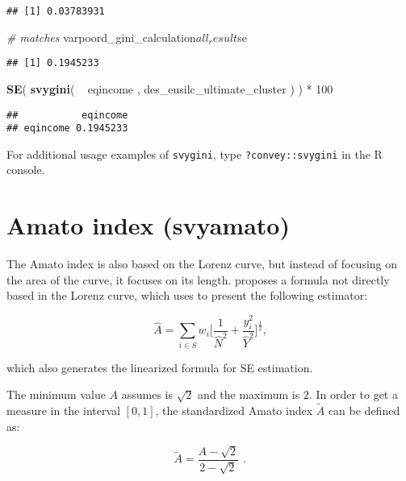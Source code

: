 \documentclass[]{book}
\newenvironment{Shaded}{\begin{snugshade}}{\end{snugshade}}
\newcommand{\KeywordTok}[1]{\textcolor[rgb]{0.13,0.29,0.53}{\textbf{{#1}}}}
\newcommand{\DecValTok}[1]{\textcolor[rgb]{0.00,0.00,0.81}{{#1}}}
\newcommand{\StringTok}[1]{\textcolor[rgb]{0.31,0.60,0.02}{{#1}}}
\newcommand{\CommentTok}[1]{\textcolor[rgb]{0.56,0.35,0.01}{\textit{{#1}}}}
\newcommand{\NormalTok}[1]{{#1}}
\theoremstyle{definition}
\theoremstyle{definition}
\theoremstyle{remark}
\begin{document}
\begin{verbatim}
## [1] 0.03783931
\end{verbatim}

\begin{Shaded}
\begin{Highlighting}[]
\CommentTok{# matches}
\NormalTok{varpoord_gini_calculation$all_result$se}
\end{Highlighting}
\end{Shaded}

\begin{verbatim}
## [1] 0.1945233
\end{verbatim}

\begin{Shaded}
\begin{Highlighting}[]
\KeywordTok{SE}\NormalTok{( }\KeywordTok{svygini}\NormalTok{( ~}\StringTok{ }\NormalTok{eqincome , des_eusilc_ultimate_cluster ) ) *}\StringTok{ }\DecValTok{100}
\end{Highlighting}
\end{Shaded}

\begin{verbatim}
##           eqincome
## eqincome 0.1945233
\end{verbatim}

For additional usage examples of \texttt{svygini}, type
\texttt{?convey::svygini} in the R console.

\section{Amato index (svyamato)}\label{amato-index-svyamato}

The Amato index is also based on the Lorenz curve, but instead of
focusing on the area of the curve, it focuses on its length.
\citep{arnold2012} proposes a formula not directly based in the Lorenz
curve, which \citep{barabesi2016} uses to present the following
estimator:

\[
\widehat{A} = \sum_{i \in S} w_i \bigg[ \frac{1}{\widehat{N}^2} + \frac{y_i^2}{\widehat{Y}^2} \bigg]^{\frac{1}{2}} \text{,}
\]

which also generates the linearized formula for SE estimation.

The minimum value \(A\) assumes is \(\sqrt{2}\) and the maximum is
\(2\). In order to get a measure in the interval \([0,1]\), the
standardized Amato index \(\widetilde{A}\) can be defined as:

\[
\widetilde{A} = \frac{ A - \sqrt{2} }{2 - \sqrt{2} } \text{ .}
\]
\end{document}
